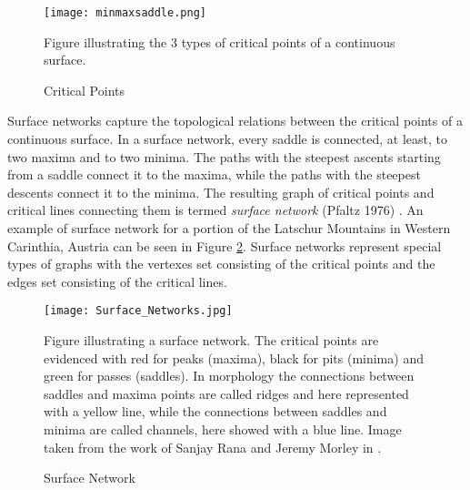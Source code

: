 \begin{figure} 
\centering
\texttt{[image: minmaxsaddle.png]}
\caption{Critical Points}
Figure illustrating the 3 types of critical points of a continuous surface.
\label{fig:critical_points}
\end{figure}

Surface networks capture the topological relations between the critical points of a continuous surface. In a surface network, every saddle is connected, at least, to two maxima and to two minima. The paths with the steepest ascents starting from a saddle connect it to the maxima, while the paths with the steepest descents connect it to the minima. The resulting graph of critical points and critical lines connecting them is termed \textit{surface network} (Pfaltz 1976) \cite{surface_networks_rana}. An example of surface network for a portion of the Latschur Mountains in Western Carinthia, Austria can be seen in Figure \ref{fig:surface_network}. Surface networks represent special types of graphs with the vertexes set consisting of the critical points and the edges set consisting of the critical lines.

\begin{figure} 
\centering
\texttt{[image: Surface\_Networks.jpg]}
\caption{Surface Network}
Figure illustrating a surface network. The critical points are evidenced with red for peaks (maxima), black for pits (minima) and green for passes (saddles). In morphology the connections between saddles and maxima points are called ridges and here represented with a yellow line, while the connections between saddles and minima are called channels, here showed with a blue line. Image taken from the work of Sanjay Rana and Jeremy Morley in \cite{surface_networks_rana}.
\label{fig:surface_network}
\end{figure}


